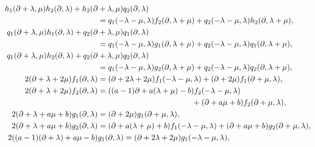 \documentclass[11pt,letterpaper,reqno]{amsart}
\theoremstyle{definition}
\numberwithin{equation}{section}
\begin{document}
\begin{align}
h_1(\partial+\lambda, \mu)h_2(\partial, \lambda)+h_2(\partial&+\lambda, \mu)q_2(\partial, \lambda)\nonumber\\
&=q_1(-\lambda-\mu, \lambda)f_2(\partial, \lambda+\mu)+q_2(-\lambda-\mu, \lambda)h_2(\partial, \lambda+\mu),\label{yyy21}\\
q_1(\partial+\lambda, \mu)h_1(\partial, \lambda)+q_2(\partial&+\lambda, \mu)q_1(\partial, \lambda)\nonumber\\
&=q_1(-\lambda-\mu, \lambda)g_1(\partial, \lambda+\mu)+q_2(-\lambda-\mu, \lambda)q_1(\partial, \lambda+\mu),\label{yyy22}\\
q_1(\partial+\lambda, \mu)h_2(\partial, \lambda)+q_2(\partial&+\lambda, \mu)q_2(\partial, \lambda)\nonumber\\
&=q_1(-\lambda-\mu, \lambda)g_2(\partial, \lambda+\mu)+q_2(-\lambda-\mu, \lambda)q_2(\partial, \lambda+\mu),\label{yyy23}\\
2(\partial+\lambda+2\mu)f_1(\partial, \lambda)&=(\partial+2\lambda+2\mu)f_1(-\lambda-\mu, \lambda)+(\partial+2\mu)f_1(\partial+\mu, \lambda),\label{yyy24}\\
2(\partial+\lambda+2\mu)f_2(\partial, \lambda)&=((a-1)\partial+a{(\lambda+\mu)}-b)f_2(-\lambda-\mu, \lambda)\nonumber\\
&\hphantom{=((a-1)\partial+a{(\lambda+\mu)}-b)} +(\partial+a\mu+b)f_2(\partial+\mu, \lambda),\label{yyy25}\\
2(\partial+\lambda+a\mu+b)g_1(\partial, \lambda)&=(\partial+2\mu)g_1(\partial+\mu, \lambda),\label{yyy26}\\
2(\partial+\lambda+a\mu+b)g_2(\partial, \lambda)&=(\partial+a(\lambda+\mu)+b)f_1(-\lambda-\mu, \lambda)+(\partial+a\mu+b)g_2(\partial+\mu, \lambda),\label{yyy27}\\
2((a-1)(\partial+\lambda)+a{\mu}-b)&g_1(\partial, \lambda)=(\partial+2\lambda+2\mu)g_1(-\lambda-\mu, \lambda),\label{yyy28}\\

\end{align}
\end{document}
